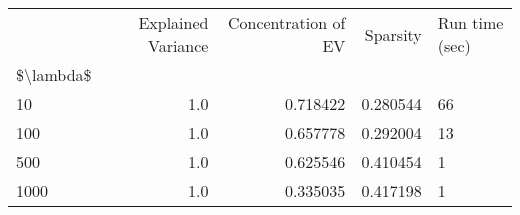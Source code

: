 \begin{tabular}{lrrrl}
\toprule
{} &  Explained Variance &  Concentration of EV &  Sparsity & Run time (sec) \\
\$\textbackslash lambda\$ &                     &                      &           &                \\
\midrule
10        &                 1.0 &             0.718422 &  0.280544 &             66 \\
100       &                 1.0 &             0.657778 &  0.292004 &             13 \\
500       &                 1.0 &             0.625546 &  0.410454 &              1 \\
1000      &                 1.0 &             0.335035 &  0.417198 &              1 \\
\bottomrule
\end{tabular}
